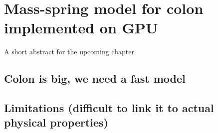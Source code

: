 \chapter{Mass-spring model for colon implemented on GPU}
\label{chap8}
\begin{shortAbstract}
A short abstract for the upcoming chapter
\end{shortAbstract}


\section{Colon is big, we need a fast model}
		
\section{Limitations (difficult to link it to actual physical properties)}